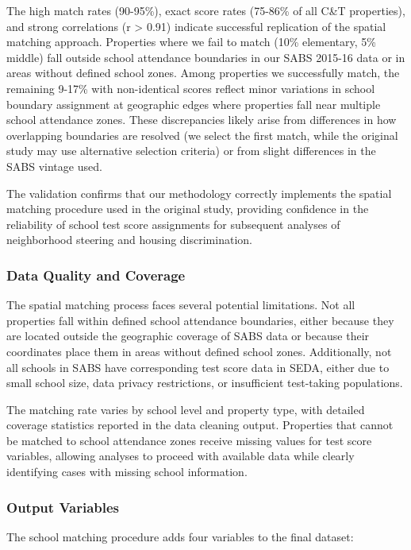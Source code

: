\documentclass{article}
\begin{document}
The high match rates (90-95\%), exact score rates (75-86\% of all C\&T properties), and strong correlations (r > 0.91) indicate successful replication of the spatial matching approach. Properties where we fail to match (10\% elementary, 5\% middle) fall outside school attendance boundaries in our SABS 2015-16 data or in areas without defined school zones. Among properties we successfully match, the remaining 9-17\% with non-identical scores reflect minor variations in school boundary assignment at geographic edges where properties fall near multiple school attendance zones. These discrepancies likely arise from differences in how overlapping boundaries are resolved (we select the first match, while the original study may use alternative selection criteria) or from slight differences in the SABS vintage used.

The validation confirms that our methodology correctly implements the spatial matching procedure used in the original study, providing confidence in the reliability of school test score assignments for subsequent analyses of neighborhood steering and housing discrimination.

\subsubsection{Data Quality and Coverage}

The spatial matching process faces several potential limitations. Not all properties fall within defined school attendance boundaries, either because they are located outside the geographic coverage of SABS data or because their coordinates place them in areas without defined school zones. Additionally, not all schools in SABS have corresponding test score data in SEDA, either due to small school size, data privacy restrictions, or insufficient test-taking populations.

The matching rate varies by school level and property type, with detailed coverage statistics reported in the data cleaning output. Properties that cannot be matched to school attendance zones receive missing values for test score variables, allowing analyses to proceed with available data while clearly identifying cases with missing school information.

\subsubsection{Output Variables}

The school matching procedure adds four variables to the final dataset:
\end{document}
